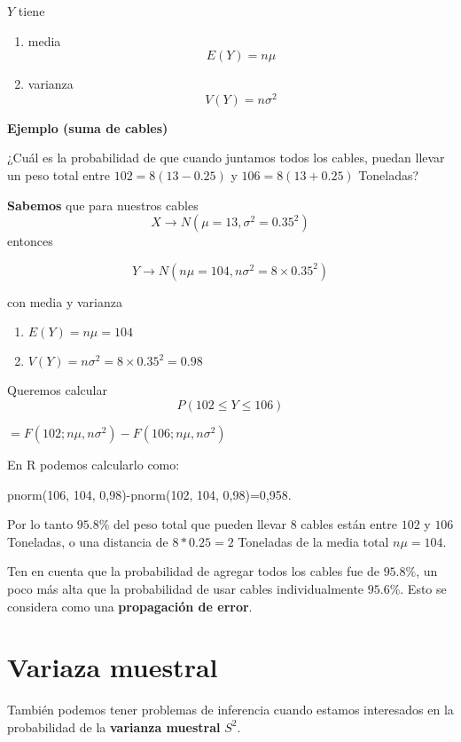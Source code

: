 \documentclass[
]{book}
\providecommand{\tightlist}{%
  \setlength{\itemsep}{0pt}\setlength{\parskip}{0pt}}
\begin{document}
\(Y\) tiene

\begin{enumerate}
\def\labelenumi{\arabic{enumi})}
\tightlist
\item
  media \[E(Y)=n\mu\]
\item
  varianza \[V(Y)=n\sigma^2\]
\end{enumerate}

\textbf{Ejemplo (suma de cables)}

¿Cuál es la probabilidad de que cuando juntamos todos los cables, puedan llevar un peso total entre \(102=8(13 - 0.25)\) y \(106=8(13+ 0.25)\) Toneladas?

\textbf{Sabemos} que para nuestros cables \[X \rightarrow N(\mu=13, \sigma^2=0.35^2)\] entonces

\[Y \rightarrow N(n\mu=104, n\sigma^2=8\times 0.35^2)\]

con media y varianza

\begin{enumerate}
\def\labelenumi{\arabic{enumi})}
\tightlist
\item
  \(E(Y)=n\mu=104\)
\item
  \(V(Y)=n\sigma^2=8\times 0.35^2=0.98\)
\end{enumerate}

Queremos calcular \[P(102 \leq Y \leq 106)\]

\(=F(102; n\mu, n\sigma^2)-F(106; n\mu, n\sigma^2)\)

En R podemos calcularlo como:

pnorm(106, 104, 0,98)-pnorm(102, 104, 0,98)=0,958.

Por lo tanto \(95.8\%\) del peso total que pueden llevar \(8\) cables están entre \(102\) y \(106\) Toneladas, o una distancia de \(8*0.25=2\) Toneladas de la media total \(n\mu=104\).

Ten en cuenta que la probabilidad de agregar todos los cables fue de \(95.8\%\), un poco más alta que la probabilidad de usar cables individualmente \(95.6\%\). Esto se considera como una \textbf{propagación de error}.

\hypertarget{variaza-muestral}{%
\section{Variaza muestral}\label{variaza-muestral}}

También podemos tener problemas de inferencia cuando estamos interesados en la probabilidad de la \textbf{varianza muestral} \(S^2\).
\end{document}
